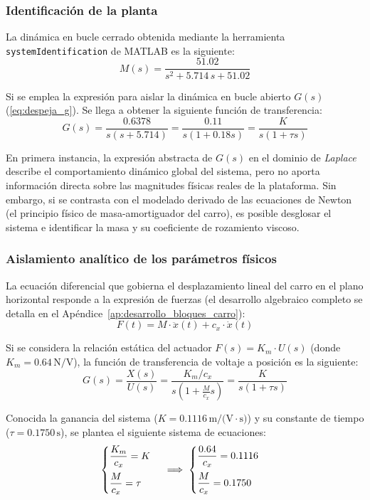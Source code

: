 \documentclass[11pt,fleqn]{book} %
\begin{document}
\subsubsection{Identificación de la planta}
La dinámica en bucle cerrado obtenida mediante la herramienta \texttt{systemIdentification} de MATLAB es la siguiente:
\begin{equation}
	M(s) = \frac{51.02}{s^2 + 5.714\,s + 51.02}
\end{equation}

Si se emplea la expresión para aislar la dinámica en bucle abierto $G(s)$ (\ref{eq:despeja_g}). Se llega a obtener la siguiente función de transferencia:
\begin{equation}
	G(s) = \frac{0.6378}{s(s + 5.714)} = \frac{0.11}{s(1 + 0.18s)} = \frac{K}{s(1 + \tau s)} 
\end{equation}

En primera instancia, la expresión abstracta de $G(s)$ en el dominio de \textit{Laplace} describe el comportamiento dinámico global del sistema, pero no aporta información directa sobre las magnitudes físicas reales de la plataforma. Sin embargo, si se contrasta con el modelado derivado de las ecuaciones de Newton (el principio físico de masa-amortiguador del carro), es posible desglosar el sistema e identificar la masa y su coeficiente de rozamiento viscoso.

\subsubsection{Aislamiento analítico de los parámetros físicos}

La ecuación diferencial que gobierna el desplazamiento lineal del carro en el plano horizontal responde a la expresión de fuerzas (el desarrollo algebraico completo se detalla en el Apéndice~\ref{ap:desarrollo_bloques_carro}):
\begin{equation}
	F(t) = M \cdot \ddot{x}(t) + c_x \cdot \dot{x}(t)
\end{equation}

Si se considera la relación estática del actuador $F(s) = K_m \cdot U(s)$ (donde $K_m = 0.64\,\text{N/V}$), la función de transferencia de voltaje a posición es la siguiente: 
\begin{equation}
	G(s) = \frac{X(s)}{U(s)} = \frac{K_m/c_x}{s\left(1 + \frac{M}{c_x}s \right)} = \frac{K}{s(1 + \tau s)}
\end{equation}

Conocida la ganancia del sistema ($K = 0.1116\,\text{m/(V}\cdot\text{s)}$) y su constante de tiempo ($\tau = 0.1750\,\text{s}$), se plantea el siguiente sistema de ecuaciones:
\begin{equation}
	\begin{cases}
		\dfrac{K_m}{c_x} = K \vspace{2mm}\\
		\dfrac{M}{c_x} = \tau
	\end{cases}
	\implies
	\begin{cases}
		\dfrac{0.64}{c_x} = 0.1116 \vspace{2mm}\\
		\dfrac{M}{c_x} = 0.1750
	\end{cases}
\end{equation}
\end{document}
